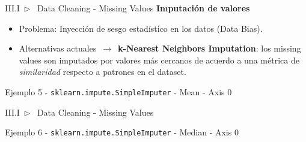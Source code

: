 \documentclass[xcolor=dvipsnames]{beamer}
\begin{document}
    \begin{frame}[fragile]{III.I~$\rhd$~ Data Cleaning - Missing Values}
        \textbf{Imputación de valores}
        \vspace{3mm}
        \begin{itemize}
            \item Problema: Inyección de sesgo estadístico en los datos (Data Bias).
            \item Alternativas actuales~$\rightarrow$~\textbf{k-Nearest Neighbors Imputation}: los missing values son imputados por valores más cercanos de acuerdo a una métrica de \textit{similaridad} respecto a patrones en el dataset.
        \end{itemize}
        \begin{exampleblock}{Ejemplo 5 - \texttt{sklearn.impute.SimpleImputer} - Mean - Axis 0}
        
        \end{exampleblock}
    \end{frame}

    \begin{frame}[fragile]{III.I~$\rhd$~ Data Cleaning - Missing Values}
        \begin{exampleblock}{Ejemplo 6 - \texttt{sklearn.impute.SimpleImputer} - Median - Axis 0}
        
        \end{exampleblock}
    \end{frame}
\end{document}
